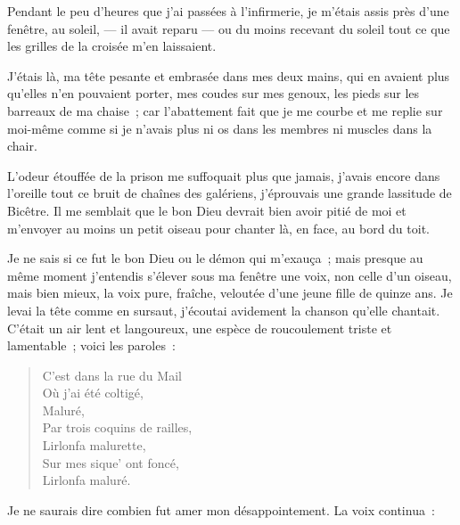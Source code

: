 \documentclass[french,twoside]{book} %
\begin{document}
\noindent Pendant le peu d’heures que j’ai passées à l’infirmerie, je m’étais assis près d’une fenêtre, au soleil, — il avait reparu — ou du moins recevant du soleil tout ce que les grilles de la croisée m’en laissaient.\par
J’étais là, ma tête pesante et embrasée dans mes deux mains, qui en avaient plus qu’elles n’en pouvaient porter, mes coudes sur mes genoux, les pieds sur les barreaux de ma chaise ; car l’abattement fait que je me courbe et me replie sur moi-même comme si je n’avais plus ni os dans les membres ni muscles dans la chair.\par
L’odeur étouffée de la prison me suffoquait plus que jamais, j’avais encore dans l’oreille tout ce bruit de chaînes des galériens, j’éprouvais une grande lassitude de Bicêtre. Il me semblait que le bon Dieu devrait bien avoir pitié de moi et m’envoyer au moins un petit oiseau pour chanter là, en face, au bord du toit.\par
Je ne sais si ce fut le bon Dieu ou le démon qui  m’exauça ; mais presque au même moment j’entendis s’élever sous ma fenêtre une voix, non celle d’un oiseau, mais bien mieux, la voix pure, fraîche, veloutée d’une jeune fille de quinze ans. Je levai la tête comme en sursaut, j’écoutai avidement la chanson qu’elle chantait. C’était un air lent et langoureux, une espèce de roucoulement triste et lamentable ; voici les paroles :\par


\begin{verse}
C’est dans la rue du Mail\\
Où j’ai été coltigé,\\
Maluré,\\
Par trois coquins de railles,\\
Lirlonfa malurette,\\
Sur mes sique’ ont foncé,\\
Lirlonfa maluré.\\
\end{verse}

\noindent Je ne saurais dire combien fut amer mon désappointement. La voix continua :\par
\end{document}
